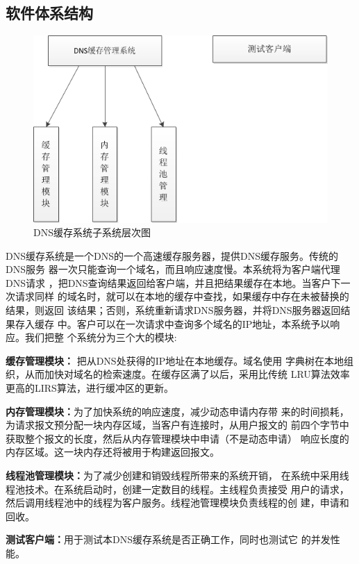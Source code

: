 \documentclass[12pt, a4paper, titlepage]{article}
\begin{document}
\subsection{软件体系结构}

\begin{figure}[H]
\centering
\includegraphics[keepaspectratio, scale=0.9]{pitures/zixitongcengcitu.png}
\caption{DNS缓存系统子系统层次图}
\end{figure}
\indent DNS缓存系统是一个DNS的一个高速缓存服务器，提供DNS缓存服务。传统的DNS服务
	器一次只能查询一个域名，而且响应速度慢。本系统将为客户端代理DNS请求
	，把DNS查询结果返回给客户端，并且把结果缓存在本地。当客户下一次请求同样
	的域名时，就可以在本地的缓存中查找，如果缓存中存在未被替换的结果，则返回
	该结果；否则，系统重新请求DNS服务器，并将DNS服务器返回结果存入缓存
	中。客户可以在一次请求中查询多个域名的IP地址，本系统予以响应。我们把整
	个系统分为三个大的模块:
	\begin{compactitem}
	\item{\textbf{缓存管理模块：} 把从DNS处获得的IP地址在本地缓存。域名使用
	字典树\cite{IDAT}在本地组织，从而加快对域名的检索速度。在缓存区满了以后，采用比传统
	LRU算法效率更高的LIRS\cite{LIRS}算法，进行缓冲区的更新。}
	\item{\textbf{内存管理模块：}为了加快系统的响应速度，减少动态申请内存带
	来的时间损耗，为请求报文预分配一块内存区域，当客户有连接时，从用户报文的
	前四个字节中获取整个报文的长度，然后从内存管理模块中申请（不是动态申请）
	响应长度的内存区域。这一块内存还将被用于构建返回报文。}
	\item{\textbf{线程池管理模块：}为了减少创建和销毁线程所带来的系统开销，
	在系统中采用线程池技术。在系统启动时，创建一定数目的线程。主线程负责接受
	用户的请求，然后调用线程池中的线程为客户服务。线程池管理模块负责线程的创
	建，申请和回收。}
	\item{\textbf{测试客户端：}用于测试本DNS缓存系统是否正确工作，同时也测试它
	的并发性能。}
	\end{compactitem}
\end{document}
